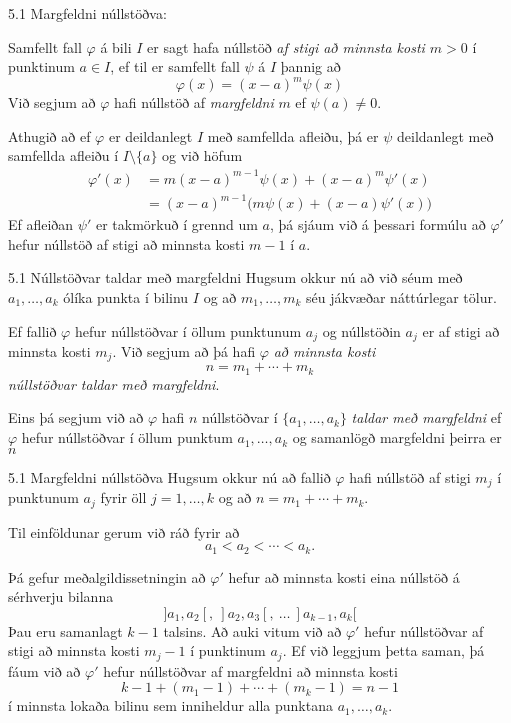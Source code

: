 \begin{frame}{5.1 Margfeldni núllstöðva:} 

Samfellt fall $\varphi$ á bili $I$ er sagt hafa núllstöð {\it af stigi 
að minnsta kosti $m>0$} í punktinum $a\in I$, ef til er samfellt fall 
$\psi$ á $I$ þannig að 
$$
\varphi(x)=(x-a)^m\psi(x)
$$   
Við segjum að $\varphi$ hafi núllstöð af {\it margfeldni} $m$ ef
$\psi(a)\neq0$.

\pause
\smallskip
Athugið að ef $\varphi$ er deildanlegt  $I$ með samfellda afleiðu, 
þá er $\psi$ deildanlegt með samfellda afleiðu í $I\setminus\{a\}$ og 
við höfum
\begin{align*}
  \varphi'(x)&=m(x-a)^{m-1}\psi(x)+(x-a)^m\psi'(x)\\
&= (x-a)^{m-1} \big(m\psi(x)+(x-a)\psi'(x)\big)
\end{align*}
Ef afleiðan $\psi'$ er takmörkuð í grennd um $a$, þá sjáum við á
þessari formúlu að 
$\varphi'$ hefur núllstöð af stigi að minnsta kosti $m-1$ í $a$.
\end{frame}

\begin{frame}{5.1 Núllstöðvar taldar með margfeldni} 
Hugsum okkur nú að við séum með $a_1,\dots,a_k$ ólíka punkta í bilinu 
$I$  og að $m_1,\dots,m_k$ séu jákvæðar náttúrlegar tölur.

\pause
Ef fallið $\varphi$ hefur núllstöðvar í öllum punktunum $a_j$ og 
núllstöðin $a_j$ er af stigi að minnsta kosti $m_j$.  Við segjum að þá
hafi $\varphi$ {\it að minnsta kosti} 
$$
n=m_1+\cdots+m_k
$$
{\it núllstöðvar taldar með margfeldni}.

\pause
\smallskip
Eins þá segjum við að  $\varphi$ hafi $n$ núllstöðvar í $\{a_1,\dots,a_k\}$ 
{\it taldar með margfeldni} ef $\varphi$ hefur 
núllstöðvar í öllum punktum $a_1,\dots,a_k$ og samanlögð margfeldni
þeirra er  $n$
\end{frame}

\begin{frame}{5.1 Margfeldni núllstöðva} 
Hugsum okkur nú að fallið $\varphi$ hafi núllstöð af stigi 
$m_j$ í punktunum $a_j$ fyrir öll $j=1,\dots,k$ og að
$n=m_1+\cdots+m_k$.  

\pause
\smallskip
Til einföldunar gerum við ráð fyrir að 
$$
a_1<a_2<\cdots<a_k.
$$

\pause
\smallskip
Þá gefur meðalgildissetningin að $\varphi'$ hefur að minnsta kosti eina
núllstöð á sérhverju bilanna 
$$
]a_1,a_2[, \  ]a_2,a_3[, \ \dots \  ]a_{k-1},a_k[ 
$$
Þau eru samanlagt $k-1$ talsins.  Að auki vitum við að 
$\varphi'$ hefur núllstöðvar af stigi að minnsta kosti 
$m_j-1$ í punktinum $a_j$.   Ef við leggjum þetta saman, þá fáum við
að $\varphi'$ hefur núllstöðvar af margfeldni að minnsta kosti 
$$
k-1+(m_1-1)+\cdots+(m_k-1)=n-1
$$
í minnsta lokaða bilinu sem inniheldur alla punktana $a_1,\dots,a_k$.  
\end{frame}

